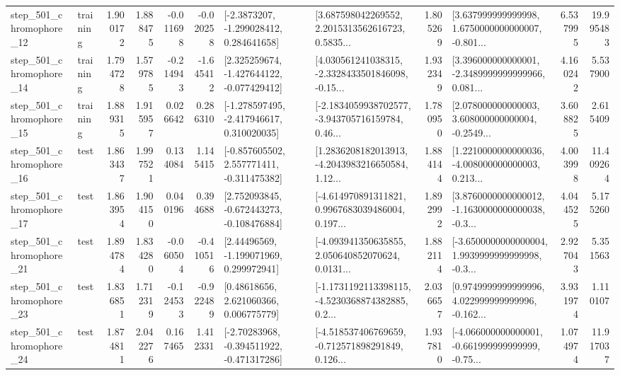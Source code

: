 \begin{tabular}{llrrrrllrlrr}
  step\_501\_chromophore\_12 &  training &      1.900172 &    1.888475 &     -0.011698 & -0.020258 &     [-2.3873207, -1.299028412, 0.284641658] &  [3.687598042269552, 2.2015313562616723, 0.5835... &       1.805269 &  [3.637999999999998, 1.6750000000000007, -0.801... &            6.537995 &         19.995483 \\
  step\_501\_chromophore\_14 &  training &      1.794728 &    1.579785 &     -0.214943 & -1.645412 &   [2.325259674, -1.427644122, -0.077429412] &  [4.030561241038315, -2.3328433501846098, -0.15... &       1.932349 &  [3.396000000000001, -2.3489999999999966, 0.081... &            4.160242 &          5.537900 \\
  step\_501\_chromophore\_15 &  training &      1.889315 &    1.915957 &      0.026642 &  0.286310 &   [-1.278597495, -2.417946617, 0.310020035] &  [-2.1834059938702577, -3.943705716159784, 0.46... &       1.780950 &  [2.078000000000003, 3.608000000000004, -0.2549... &            3.608825 &          2.615409 \\
  step\_501\_chromophore\_16 &      test &      1.863437 &    1.997521 &      0.134084 &  1.145415 &   [-0.857605502, 2.557771411, -0.311475382] &  [1.2836208182013913, -4.2043983216650584, 1.12... &       1.884144 &  [1.2210000000000036, -4.008000000000003, 0.213... &            4.003998 &         11.409264 \\
  step\_501\_chromophore\_17 &      test &      1.863954 &    1.904150 &      0.040196 &  0.394688 &   [2.752093845, -0.672443273, -0.108476884] &  [-4.614970891311821, 0.9967683039486004, 0.197... &       1.892992 &  [3.8760000000000012, -1.1630000000000038, -0.3... &            4.044525 &          5.175260 \\
  step\_501\_chromophore\_21 &      test &      1.894784 &    1.834280 &     -0.060504 & -0.410516 &     [2.44496569, -1.199071969, 0.299972941] &  [-4.093941350635855, 2.050640852070624, 0.0131... &       1.882114 &  [-3.6500000000000004, 1.9939999999999998, -0.3... &            2.927043 &          5.351563 \\
  step\_501\_chromophore\_23 &      test &      1.836851 &    1.712319 &     -0.124533 & -0.922489 &      [0.48618656, 2.621060366, 0.006775779] &  [-1.1731192113398115, -4.5230368874382885, 0.2... &       2.036657 &  [0.9749999999999996, 4.022999999999996, -0.162... &            3.931974 &          1.110107 \\
  step\_501\_chromophore\_24 &      test &      1.874811 &    2.042276 &      0.167465 &  1.412331 &   [-2.70283968, -0.394511922, -0.471317286] &  [-4.518537406769659, -0.712571898291849, 0.126... &       1.937810 &  [-4.066000000000001, -0.661999999999999, -0.75... &            1.074974 &         11.917037 \\

\end{tabular}
